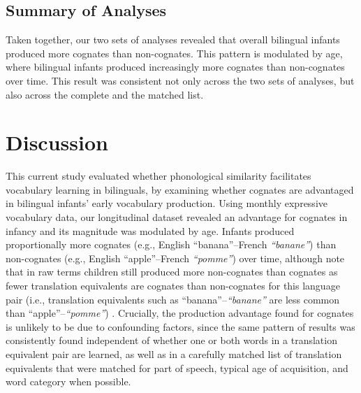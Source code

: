 \documentclass[
  english,
  ,man,floatsintext]{apa6}
\begin{document}
\hypertarget{summary-of-analyses}{%
\subsection{Summary of Analyses}\label{summary-of-analyses}}

Taken together, our two sets of analyses revealed that overall bilingual infants produced more cognates than non-cognates. This pattern is modulated by age, where bilingual infants produced increasingly more cognates than non-cognates over time. This result was consistent not only across the two sets of analyses, but also across the complete and the matched list.

\hypertarget{discussion}{%
\section{Discussion}\label{discussion}}

This current study evaluated whether phonological similarity facilitates vocabulary learning in bilinguals, by examining whether cognates are advantaged in bilingual infants' early vocabulary production. Using monthly expressive vocabulary data, our longitudinal dataset revealed an advantage for cognates in infancy and its magnitude was modulated by age. Infants produced proportionally more cognates (e.g., English ``banana''--French \emph{``banane''}) than non-cognates (e.g., English ``apple''--French \emph{``pomme''}) over time, although note that in raw terms children still produced more non-cognates than cognates as fewer translation equivalents are cognates than non-cognates for this language pair (i.e., translation equivalents such as ``banana''--\emph{``banane''} are less common than ``apple''--\emph{``pomme''}) . Crucially, the production advantage found for cognates is unlikely to be due to confounding factors, since the same pattern of results was consistently found independent of whether one or both words in a translation equivalent pair are learned, as well as in a carefully matched list of translation equivalents that were matched for part of speech, typical age of acquisition, and word category when possible.
\end{document}
